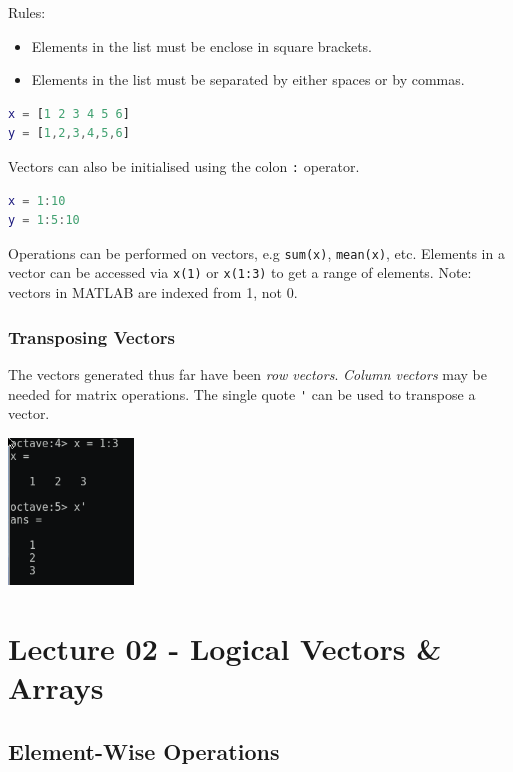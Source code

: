 \documentclass[11pt]{article}
\begin{document}
Rules:
\begin{itemize}
    \item Elements in the list must be enclose in square brackets. 
    \item Elements in the list must be separated by either spaces or by commas. 
\end{itemize}

\begin{lstlisting}[language=MATLAB]
x = [1 2 3 4 5 6]
y = [1,2,3,4,5,6]
\end{lstlisting}

Vectors can also be initialised using the colon \verb|:| operator. 
\begin{lstlisting}[language=MATLAB]
x = 1:10 
y = 1:5:10
\end{lstlisting}

Operations can be performed on vectors, e.g \verb|sum(x)|, \verb|mean(x)|, etc. 
Elements in a vector can be accessed via \verb|x(1)| or \verb|x(1:3)| to get a range of elements. 
Note: vectors in MATLAB are indexed from 1, not 0. 

\subsubsection{Transposing Vectors} 
The vectors generated thus far have been \textit{row vectors}. 
\textit{Column vectors} may be needed for matrix operations. 
The single quote \verb|'| can be used to transpose a vector. 

\begin{center}
    \includegraphics[width=0.25\textwidth]{singlequote.png}
\end{center}

\section{Lecture 02 - Logical Vectors \& Arrays}
\subsection{Element-Wise Operations}
\end{document}
